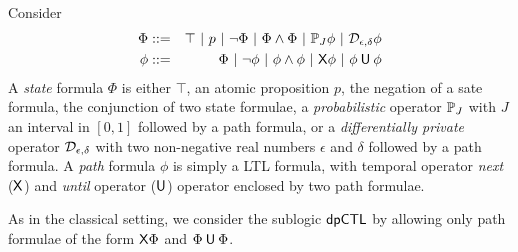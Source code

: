 
Consider
\begin{eqnarray*}
  \Phi & ::= & \top \ |\ p \ |\ \neg \Phi \ |\ \Phi \wedge \Phi \ |\
               \PJ{J} \phi \ |\ \dpriv{\epsilon}{\delta} \phi\\
  \phi & ::= & \Phi \ |\ \neg\phi  \ |\  \phi\wedge\phi  \ |\  \X \phi \ |\ \phi \until \phi
\end{eqnarray*}
A \emph{state} formula $\Phi$ is either $\top$, an atomic proposition
$p$, the negation of a sate formula, the conjunction of two state
formulae, a \emph{probabilistic} operator $\mathbb{P}_{J}$ with $J$
an interval in $[0, 1]$ followed by a path formula, or a
\emph{differentially private} operator $\mathcal{D}_{{\epsilon}, {\delta}}$
 with two non-negative real numbers $\epsilon$ and $\delta$ followed
 by a path formula. A
\emph{path} formula $\phi$ is simply a LTL formula, with temporal operator \emph{next}  ($\mathsf{X}$)
and  \emph{until} operator
($\mathbin{\mathsf{U}}$) operator enclosed by two path formulae.

As in the classical setting, we consider the sublogic $\textsf{dpCTL}$ by allowing only path formulae of the form $\mathsf{X}\Phi$ and $\Phi\mathbin{\mathsf{U}}\Phi$.  